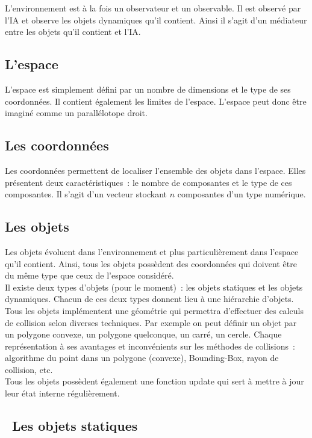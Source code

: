 L'environnement est à la fois un observateur et un observable. Il est observé par l'IA et observe les objets dynamiques qu'il contient. Ainsi il s'agit d'un médiateur entre les objets qu'il contient et l'IA.

\subsection*{L'espace}

L'espace est simplement défini par un nombre de dimensions et le type de ses coordonnées.
Il contient également les limites de l'espace. L'espace peut donc être imaginé comme un parallélotope droit.

\subsection*{Les coordonnées}

Les coordonnées permettent de localiser l'ensemble des objets dans l'espace. Elles présentent deux caractéristiques~: le nombre de composantes et le type de ces composantes. Il s'agit d'un vecteur stockant $n$ composantes d'un type numérique.

\subsection*{Les objets}

Les objets évoluent dans l'environnement et plus particulièrement dans l'espace qu'il contient. Ainsi, tous les objets possèdent des coordonnées qui doivent être du même type que ceux de l'espace considéré.\\
\indent Il existe deux types d'objets (pour le moment)~: les objets statiques et les objets dynamiques. Chacun de ces deux types donnent lieu à une hiérarchie d'objets.\\

Tous les objets implémentent une géométrie qui permettra d'effectuer des calculs de collision selon diverses techniques. Par exemple on peut définir un objet par un polygone convexe, un polygone quelconque, un carré, un cercle. Chaque représentation à ses avantages et inconvénients sur les méthodes de collisions~: algorithme du point dans un polygone (convexe), Bounding-Box, rayon de collision, etc.\\

Tous les objets possèdent également une fonction update qui sert à mettre à jour leur état interne régulièrement.

\subsection*{\textbullet ~Les objets statiques}

